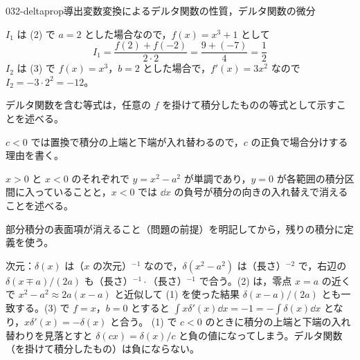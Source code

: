 \documentclass[uplatex,dvipdfmx,a4paper,11pt]{jsarticle}
\begin{document}
\begin{mondai}{032-deltaprop}{導出}{変数変換によるデルタ関数の性質，デルタ関数の微分}
\begin{tadashii}
 $I_{1}$ は (2) で $a=2$ とした場合なので，$f(x)=x^{3}+1$ として
\[ I_{1}=\frac{f(2)+f(-2)}{2\cdot 2}=\frac{9+(-7)}{4}=\frac{1}{2} \]
$I_{2}$ は (3) で $f(x)=x^{3}$，$b=2$ とした場合で，$f'(x)=3x^{2}$ なので $I_{2}=-3\cdot 2^{2}=-12$。
\begin{ronten}
  \item デルタ関数を含む等式は，任意の $f$ を掛けて積分したものの等式として示すことを述べる。
  \item {} $c<0$ では置換で積分の上端と下端が入れ替わるので，$c$ の正負で場合分けする理由を書く。
  \item {} $x>0$ と $x<0$ のそれぞれで $y=x^{2}-a^{2}$ が単調であり，$y=0$ が各範囲の積分区間に入っていることと，$x<0$ では $\dd x$ の負号が積分の向きの入れ替えで消えることを述べる。
  \item {} 部分積分の表面項が消えること（問題の前提）を明記してから，残りの積分に定義を使う。
\end{ronten}
\kenzan 次元：$\delta(x)$ は（$x$ の次元）$^{-1}$ なので，$\delta(x^{2}-a^{2})$ は（長さ）$^{-2}$ で，右辺の $\delta(x\mp a)/(2a)$ も（長さ）$^{-1}\cdot$（長さ）$^{-1}$ で合う。(2) は，零点 $x=a$ の近くで $x^{2}-a^{2}\approx 2a(x-a)$ と近似して (1) を使った結果 $\delta(x-a)/(2a)$ とも一致する。(3) で $f=x$，$b=0$ とすると $\int x\delta'(x)\dd x=-1=-\int\delta(x)\dd x$ となり，$x\delta'(x)=-\delta(x)$ と合う。
\tsumazuki (1) で $c<0$ のときに積分の上端と下端の入れ替わりを見落とすと $\delta(cx)=\delta(x)/c$ と負の値になってしまう。デルタ関数（を掛けて積分したもの）は負にならない。
\end{tadashii}
\end{mondai}

\noteowari
\end{document}
